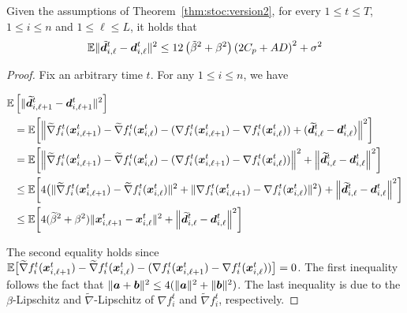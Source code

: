 \setcounter{lemma}{4}
\begin{lemma}
Given the assumptions of Theorem~\ref{thm:stoc:version2}, for every $1 \leq t \leq T$, $1 \leq i \leq n$ and $1 \leq \ell \leq L$, it holds that 
\begin{equation*}
    \mathbb{E}{\|\Tilde{\bm{d}}^t_{i,\ell} - \bm{d}^t_{i,\ell} \|^2} \leq 12\left(\Tilde{\beta}^2 + \beta^2\right) \left(2C_p + AD \right)^2 + \sigma^2
\end{equation*}
\end{lemma}
\begin{proof}
    Fix an arbitrary time $t$. For any $1 \leq i \leq n$, we have 

\begin{align}	\label{eq:claim-d-1}
\E & \left[  \| \widetilde{\vect{d}}^t_{i,\ell + 1} - \vect{d}^t_{i,\ell+1} \|^2 \right] 	\notag \\
%
&= \E \biggl[ \left \| \widetilde{\nabla} f^{t}_{i}(\vect{x}^{t}_{i,\ell+1}) - \widetilde{\nabla} f^{t}_{i}(\vect{x}^{t}_{i,\ell}) - ( \nabla f^{t}_{i}(\vect{x}^{t}_{i,\ell+1}) - \nabla f^{t}_{i}(\vect{x}^{t}_{i,\ell}) )+   (\widetilde{\vect{d}}^t_{i,\ell} - \vect{d}^t_{i,\ell}) \right \|^2 \biggr] 	\notag \\
%
&= \E \biggl[ \left \| \widetilde{\nabla} f^{t}_{i}(\vect{x}^{t}_{i,\ell+1}) - \widetilde{\nabla} f^{t}_{i}(\vect{x}^{t}_{i,\ell}) - ( \nabla f^{t}_{i}(\vect{x}^{t}_{i,\ell+1})  - \nabla f^{t}_{i}(\vect{x}^{t}_{i,\ell}) ) \right \|^{2} +   \left  \| \widetilde{\vect{d}}^t_{i,\ell} - \vect{d}^t_{i,\ell} \right \|^2 \biggr] 	\notag \\
%
&\leq \E \biggl[ 4 \bigl( \| \widetilde{\nabla} f^{t}_{i}(\vect{x}^{t}_{i,\ell+1}) - \widetilde{\nabla} f^{t}_{i}(\vect{x}^{t}_{i,\ell}) \|^{2}
	+ \| \nabla f^{t}_{i}(\vect{x}^{t}_{i,\ell+1})  - \nabla f^{t}_{i}(\vect{x}^{t}_{i,\ell}) \|^{2} \bigr)
	+ \left  \| \widetilde{\vect{d}}^t_{i,\ell} - \vect{d}^t_{i,\ell} \right \|^2 \biggr]	\notag \\
%
&\leq \E \biggl [4 (\widetilde{\beta}^{2} + \beta^{2}) \| \vect{x}^{t}_{i,\ell+1} - \vect{x}^{t}_{i,\ell}\|^{2}
	+  \left  \| \widetilde{\vect{d}}^t_{i,\ell} - \vect{d}^t_{i,\ell} \right \|^2 \biggr]
%
\end{align}

The second equality holds since 
$\mathbb{E} \bigl[ \widetilde{\nabla} f^{t}_{i}(\bm{x}^{t}_{i,\ell+1}) - \widetilde{\nabla} f^{t}_{i}(\bm{x}^{t}_{i,\ell}) - ( \nabla f^{t}_{i}(\bm{x}^{t}_{i,\ell+1})  - \nabla f^{t}_{i}(\bm{x}^{t}_{i,\ell}) ) \bigr ] = 0$. 
The first inequality follows the fact that $\|\bm{a} + \bm{b}\|^{2} \leq 4 ( \| \bm{a} \|^{2} + \| \bm{b} \|^{2}) $.
The last inequality is due to the $\beta$-Lipschitz and $\widetilde{\nabla}$-Lipschitz of $\nabla f^{t}_{i}$ 
and $ \widetilde{\nabla} f^{t}_{i}$, respectively.


\end{proof}

